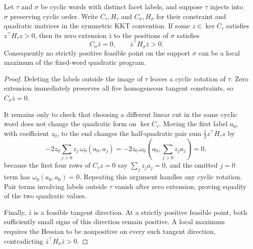 \begin{lemma}%
\label{lem:kkt-cyclic-obstruction-inheritance}
Let \(\tau\) and \(\sigma\) be cyclic words with distinct facet labels, and
suppose \(\tau\) injects into \(\sigma\) preserving cyclic order.  Write
\(C_\tau,H_\tau\) and \(C_\sigma,H_\sigma\) for their constraint and
quadratic matrices in the symmetric KKT convention.  If some
\(z\in\ker C_\tau\) satisfies \(z^\top H_\tau z>0\), then its zero extension
\(\bar z\) to the positions of \(\sigma\) satisfies
\[
 C_\sigma\bar z=0,\qquad
 \bar z^\top H_\sigma\bar z>0.
\]
Consequently no strictly positive feasible point on the support \(\sigma\)
can be a local maximum of the fixed-word quadratic program.
\end{lemma}

\begin{proof}
Deleting the labels outside the image of \(\tau\) leaves a cyclic rotation of
\(\tau\).  Zero extension immediately preserves all five homogeneous tangent
constraints, so \(C_\sigma\bar z=0\).

It remains only to check that choosing a different linear cut in the same
cyclic word does not change the quadratic form on \(\ker C_\tau\).  Moving
the first label \(a_0\), with coefficient \(z_0\), to the end changes the
half-quadratic pair sum \(\tfrac12z^\top H_\tau z\) by
\[
 -2z_0\sum_{j>0}z_j\,\omega_0(a_0,a_j)
 =-2z_0\,\omega_0\!\left(a_0,\sum_{j>0}z_ja_j\right)=0,
\]
because the first four rows of \(C_\tau z=0\) say
\(\sum_jz_ja_j=0\), and the omitted \(j=0\) term has
\(\omega_0(a_0,a_0)=0\).  Repeating this argument handles any cyclic
rotation.  Pair terms involving labels outside \(\tau\) vanish after zero
extension, proving equality of the two quadratic values.

Finally, \(\bar z\) is a feasible tangent direction.  At a strictly positive
feasible point, both sufficiently small signs of this direction remain
positive.  A local maximum requires the Hessian to be nonpositive on every
such tangent direction, contradicting
\(\bar z^\top H_\sigma\bar z>0\).
\end{proof}

